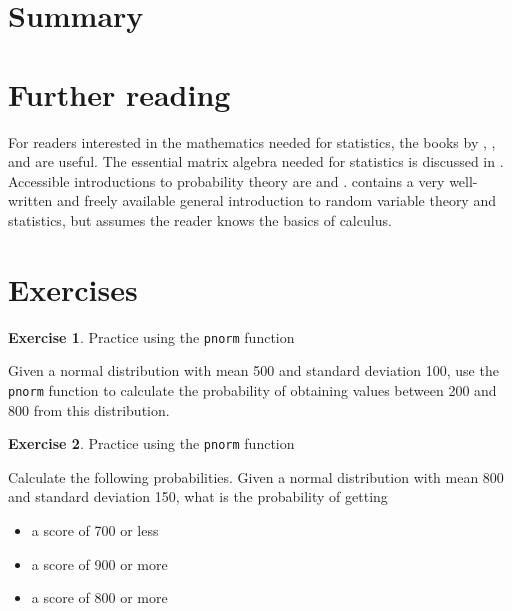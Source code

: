 \documentclass[
  12pt,
]{krantz}
\providecommand{\tightlist}{%
  \setlength{\itemsep}{0pt}\setlength{\parskip}{0pt}}
\theoremstyle{definition}
\theoremstyle{definition}
\theoremstyle{definition}
\newtheorem{exercise}{Exercise}[chapter]
\theoremstyle{definition}
\theoremstyle{remark}
\begin{document}
\hypertarget{summary}{%
\section{Summary}\label{summary}}

\hypertarget{further-reading}{%
\section{Further reading}\label{further-reading}}

For readers interested in the mathematics needed for statistics, the books by \citet{fox2009mathematical}, \citet{gill2006essential}, and \citet{moore2013mathematics} are useful. The essential matrix algebra needed for statistics is discussed in \citet{fieller}. Accessible introductions to probability theory are \citet{morin2016probability} and \citet{blitzstein2014introduction}. \citet{kerns} contains a very well-written and freely available general introduction to random variable theory and statistics, but assumes the reader knows the basics of calculus.

\hypertarget{sec:Foundationsexercises}{%
\section{Exercises}\label{sec:Foundationsexercises}}

\begin{exercise}
\protect\hypertarget{exr:Foundationsexercisespnorm1}{}\label{exr:Foundationsexercisespnorm1}Practice using the \texttt{pnorm} function
\end{exercise}

Given a normal distribution with mean 500 and standard deviation 100, use the \texttt{pnorm} function to calculate the probability of obtaining values between 200 and 800 from this distribution.

\begin{exercise}
\protect\hypertarget{exr:Foundationsexercisespnorm2}{}\label{exr:Foundationsexercisespnorm2}Practice using the \texttt{pnorm} function
\end{exercise}

Calculate the following probabilities.
Given a normal distribution with mean 800 and standard deviation 150, what is the probability of getting

\begin{itemize}
\tightlist
\item
  a score of 700 or less
\item
  a score of 900 or more
\item
  a score of 800 or more
\end{itemize}
\end{document}
